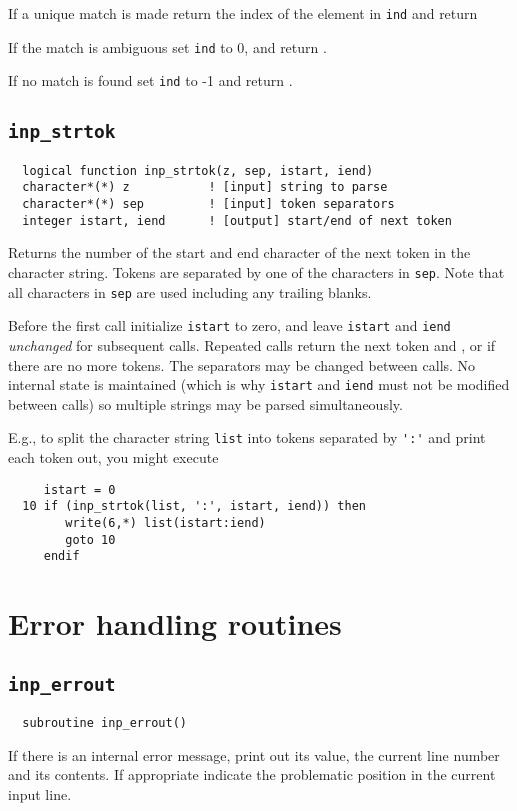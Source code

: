 If a unique match is made return the index of the element in
\verb+ind+ and return \TRUE

If the match is ambiguous set \verb+ind+ to 0, and return \FALSE.

If no match is found set \verb+ind+ to -1 and return \FALSE.

\subsection{{\tt inp\_strtok}}
\begin{verbatim}
  logical function inp_strtok(z, sep, istart, iend)
  character*(*) z           ! [input] string to parse
  character*(*) sep         ! [input] token separators
  integer istart, iend      ! [output] start/end of next token
\end{verbatim}
Returns the number of the start and end character of the next token in
the character string.  Tokens are separated by one of the characters
in \verb+sep+.  Note that all characters in \verb+sep+ are used including any
trailing blanks.

Before the first call initialize \verb+istart+ to zero, and leave
\verb+istart+ and \verb+iend+ {\em unchanged} for subsequent calls.
Repeated calls return the next token and \TRUE, or \FALSE if there are
no more tokens.  The separators may be changed between calls.  No
internal state is maintained (which is why \verb+istart+ and
\verb+iend+ must not be modified between calls) so multiple strings
may be parsed simultaneously.

E.g., to split the character string \verb+list+ into tokens separated 
by \verb+':'+ and print each token out, you might execute
\begin{verbatim}
     istart = 0
  10 if (inp_strtok(list, ':', istart, iend)) then
        write(6,*) list(istart:iend)
        goto 10
     endif
\end{verbatim}

\section{Error handling routines}

\subsection{{\tt inp\_errout}}
\begin{verbatim}
  subroutine inp_errout()
\end{verbatim}
If there is an internal error message, print out its value, the
current line number and its contents.  If appropriate indicate the
problematic position in the current input line.

